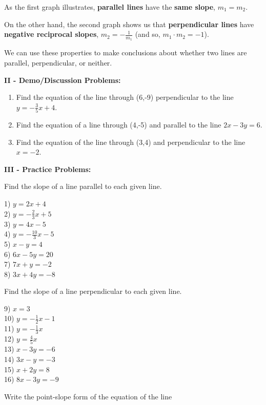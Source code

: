 \documentclass[12pt]{article}
\theoremstyle{definition}
\begin{document}
As the first graph illustrates, {\bf parallel lines} have the {\bf same slope}, $m_1=m_2$.\\
\par
On the other hand, the second graph shows us that {\bf perpendicular lines} have {\bf negative reciprocal slopes}, $m_2=-\frac{1}{m_1}$ (and so, $m_1\cdot m_2=-1$).\\
\par
We can use these properties to make conclusions about whether two lines are parallel, perpendicular, or neither.\\
\par
{\bf II - Demo/Discussion Problems:}
\begin{enumerate}
	\item Find the equation of the line through (6,-9) perpendicular to the line $y=-\frac{3}{5}x+4$.
	\item Find the equation of a line through (4,-5) and parallel to the line $2x-3y=6$.
	\item Find the equation of the line through (3,4) and perpendicular to the line $x=-2$.
\end{enumerate}
{\bf III - Practice Problems:}\\
\par
Find the slope of a line parallel to each given line.
\begin{multicols}{4}
  1) $y = 2 x + 4$\\
  2) $y = - \frac{2}{3} x + 5$\\
  3) $y = 4 x - 5$\\
  4) $y = - \frac{10}{3} x - 5$\\
  5) $x - y = 4$\\
  6) $6 x - 5 y = 20$\\
  7) $7 x + y = - 2$\\
  8) $3 x + 4 y = - 8$
\end{multicols}
Find the slope of a line perpendicular to each given line.
\begin{multicols}{4}
  9) $x = 3$\\
  10) $y = - \frac{1}{2} x - 1$\\
  11) $y = - \frac{1}{3} x$\\
  12) $y = \frac{4}{5} x$\\
  13) $x - 3 y = - 6$\\
  14) $3 x - y = - 3$\\
  15) $x + 2 y = 8$\\
  16) $8 x - 3 y = - 9$
\end{multicols}
Write the point-slope form of the equation of the line
\end{document}
